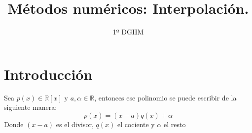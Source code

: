 \documentclass{article}
\title{\LARGE{\textbf{Métodos numéricos: Interpolación.}}}
\author{1º DGIIM}
\date{}
\begin{document}
\maketitle

\hrulefill

\section{Introducción}

Sea $p(x)\in\mathbb{R}[x]$ y $a,\alpha\in\mathbb{R}$, entonces ese polinomio se puede escribir de la siguiente manera:
$$p(x)=(x-a)q(x)+\alpha$$
Donde $(x-a)$ es el divisor, $q(x)$ el cociente y $\alpha$ el resto
\end{document}
